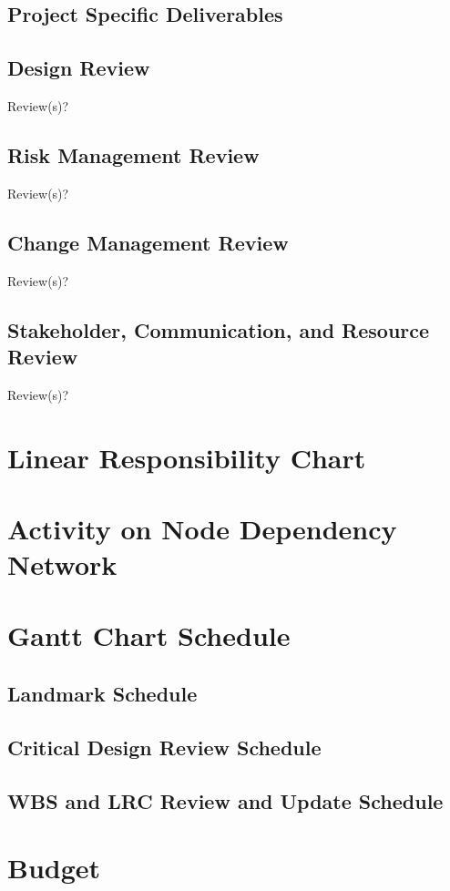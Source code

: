 \subsection{Project Specific Deliverables}
\subsection{Design Review}
Review(s)?
\subsection{Risk Management Review}
Review(s)?
\subsection{Change Management Review}
Review(s)?
\subsection{Stakeholder, Communication, and Resource Review}
Review(s)?
\section{Linear Responsibility Chart}
\section{Activity on Node Dependency Network}
\section{Gantt Chart Schedule}
\subsection{Landmark Schedule}
\subsection{Critical Design Review Schedule}
\subsection{WBS and LRC Review and Update Schedule}
\section{Budget}
